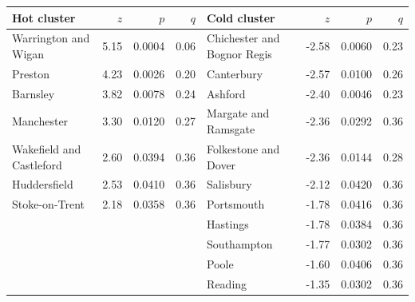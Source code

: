\begin{tabular}{lrrrlrrr}
\toprule
Hot cluster & $z$ & $p$ & $q$ & Cold cluster & $z$ & $p$ & $q$
\\
\midrule
Warrington and Wigan & 5.15 & 0.0004 & 0.06 & Chichester and Bognor Regis & -2.58 & 0.0060 & 0.23 \\
Preston & 4.23 & 0.0026 & 0.20 & Canterbury & -2.57 & 0.0100 & 0.26 \\
Barnsley & 3.82 & 0.0078 & 0.24 & Ashford & -2.40 & 0.0046 & 0.23 \\
Manchester & 3.30 & 0.0120 & 0.27 & Margate and Ramsgate & -2.36 & 0.0292 & 0.36 \\
Wakefield and Castleford & 2.60 & 0.0394 & 0.36 & Folkestone and Dover & -2.36 & 0.0144 & 0.28 \\
Huddersfield & 2.53 & 0.0410 & 0.36 & Salisbury & -2.12 & 0.0420 & 0.36 \\
Stoke-on-Trent & 2.18 & 0.0358 & 0.36 & Portsmouth & -1.78 & 0.0416 & 0.36 \\
 &  &  &  & Hastings & -1.78 & 0.0384 & 0.36 \\
 &  &  &  & Southampton & -1.77 & 0.0302 & 0.36 \\
 &  &  &  & Poole & -1.60 & 0.0406 & 0.36 \\
 &  &  &  & Reading & -1.35 & 0.0302 & 0.36 \\
\bottomrule
\end{tabular}
